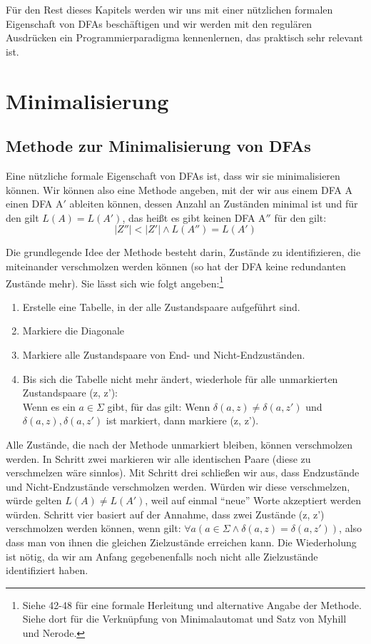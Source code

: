 Für den Rest dieses Kapitels
werden wir uns mit einer nützlichen formalen Eigenschaft von DFAs beschäftigen
und wir werden mit den regulären Ausdrücken ein Programmierparadigma kennenlernen,
das praktisch sehr relevant ist.

\section{Minimalisierung}

\subsection{Methode zur Minimalisierung von DFAs}

Eine nützliche formale Eigenschaft von DFAs ist,
dass wir sie minimalisieren können.
Wir können also eine Methode angeben,
mit der wir aus einem DFA A einen DFA A$'$ ableiten können,
dessen Anzahl an Zuständen minimal ist 
und für den gilt $L(A) = L(A')$,
das heißt es gibt keinen DFA A$''$ für den gilt:
\[|Z''| < |Z'| \wedge L(A'') = L(A') \]

Die grundlegende Idee der Methode besteht darin,
Zustände zu identifizieren,
die miteinander verschmolzen werden können
(so hat der DFA keine redundanten Zustände mehr).
Sie lässt sich wie folgt angeben:\footnote{
    Siehe \cite{schoening} 42-48
    für eine formale Herleitung und alternative Angabe der Methode.
    Siehe dort für die Verknüpfung von Minimalautomat und Satz von Myhill und Nerode.}

\begin{enumerate}
    \item Erstelle eine Tabelle, in der alle Zustandspaare aufgeführt sind.
    \item Markiere die Diagonale 
    \item Markiere alle Zustandspaare von End- und Nicht-Endzuständen.
    \item Bis sich die Tabelle nicht mehr ändert,
        wiederhole für alle unmarkierten Zustandspaare (z, z'):\\
        Wenn es ein $a \in \Sigma$ gibt,
        für das gilt:
        Wenn $\delta(a,z) \neq \delta(a,z')$ und $\delta(a, z), \delta(a, z')$ ist markiert,
        dann markiere (z, z').
\end{enumerate}

Alle Zustände, die nach der Methode unmarkiert bleiben,
können verschmolzen werden.
In Schritt zwei markieren wir alle identischen Paare
(diese zu verschmelzen wäre sinnlos).
Mit Schritt drei schließen wir aus,
dass Endzustände und Nicht-Endzustände verschmolzen werden. 
Würden wir diese verschmelzen,
würde gelten $L(A) \neq L(A')$,
weil auf einmal ``neue'' Worte akzeptiert werden würden.
Schritt vier basiert auf der Annahme, dass zwei Zustände (z, z') verschmolzen werden können,
wenn gilt: $\forall a(a \in \Sigma \wedge \delta(a, z) = \delta(a, z'))$,
also dass man von ihnen die gleichen Zielzustände erreichen kann.
Die Wiederholung ist nötig,
da wir am Anfang gegebenenfalls noch nicht alle Zielzustände identifiziert haben.


